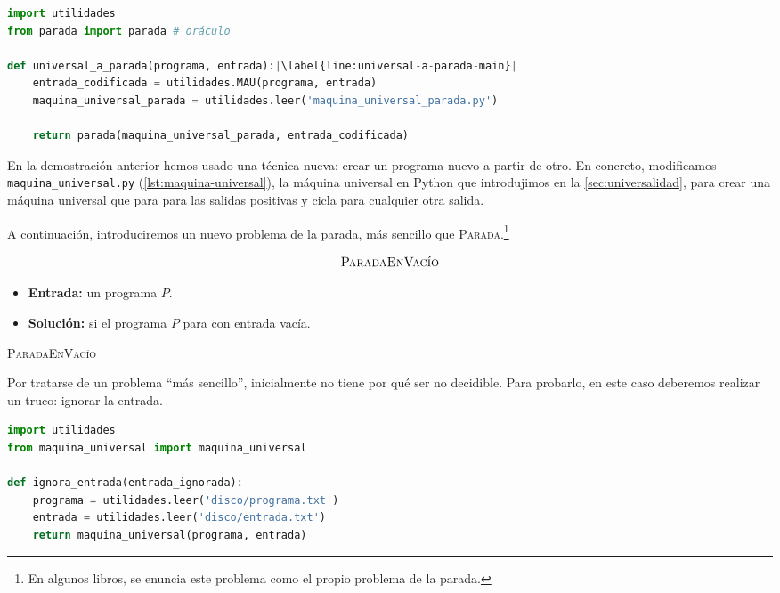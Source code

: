 \begin{lstlisting}[language=Python, caption=\lstinline{universal_a_parada.py},label={lst:universal-a-parada}]
import utilidades
from parada import parada # oráculo

def universal_a_parada(programa, entrada):|\label{line:universal-a-parada-main}|
    entrada_codificada = utilidades.MAU(programa, entrada)
    maquina_universal_parada = utilidades.leer('maquina_universal_parada.py')

    return parada(maquina_universal_parada, entrada_codificada)
\end{lstlisting}

En la demostración anterior hemos usado una técnica nueva: crear un programa nuevo a partir de otro. En concreto, modificamos \texttt{maquina\_universal.py} (\cref{lst:maquina-universal}), la máquina universal en Python que introdujimos en la \cref{sec:universalidad}, para crear una máquina universal que para para las salidas positivas y cicla para cualquier otra salida.

A continuación, introduciremos un nuevo problema de la parada, más sencillo que \textsc{Parada}.\footnote{En algunos libros, se enuncia este problema como el propio problema de la parada.}

\vspace{8pt}
\begin{problema}
\begin{framed}
$$\text{\textsc{ParadaEnVacío}}$$

\begin{itemize}
    \item \textbf{Entrada:} un programa $P$.
    \item \textbf{Solución:} si el programa $P$ para con entrada vacía.
\end{itemize}
\end{framed}
\caption{\textsc{ParadaEnVacío}}
\label{prob:parada-en-vacio}
\end{problema}

Por tratarse de un problema ``más sencillo'', inicialmente no tiene por qué ser no decidible. Para probarlo, en este caso deberemos realizar un truco: ignorar la entrada.
\vspace{8pt}
\begin{lstlisting}[language=Python, caption=\lstinline{ignora_entrada.py},label={lst:ignora-entrada}]
import utilidades
from maquina_universal import maquina_universal

def ignora_entrada(entrada_ignorada):
    programa = utilidades.leer('disco/programa.txt')
    entrada = utilidades.leer('disco/entrada.txt')
    return maquina_universal(programa, entrada)
\end{lstlisting}

